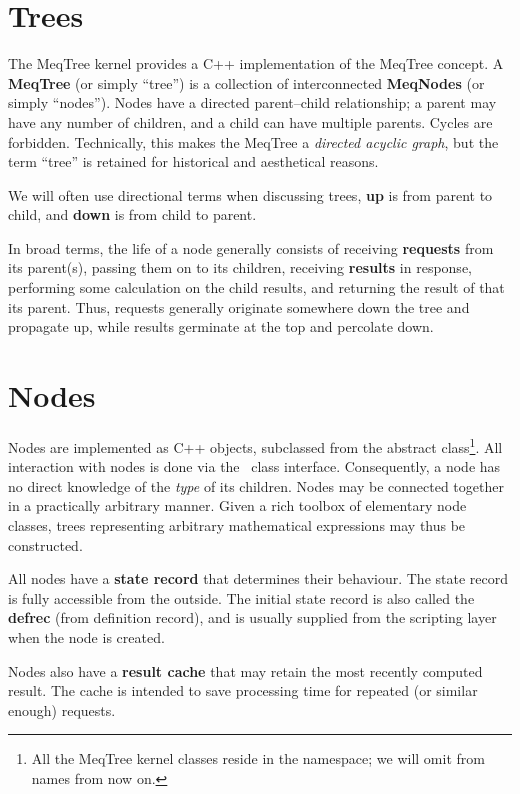 \documentclass[10pt,twoside]{book}
\begin{document}
\section{Trees}

  The MeqTree kernel provides a C++ implementation of the MeqTree concept. A {\bf
  MeqTree} (or simply ``tree'') is a collection of interconnected {\bf MeqNodes}
  (or simply ``nodes''). Nodes have a directed parent--child relationship; a
  parent may have any number of children, and a child can have multiple parents.
  Cycles are forbidden. Technically, this makes the MeqTree a {\em directed
  acyclic graph}, but the term ``tree'' is retained for historical and
  aesthetical reasons.

  We will often use directional terms when discussing trees, {\bf up} is from
  parent to child, and {\bf down} is from child to parent.

  In broad terms, the life of a node generally consists of receiving {\bf
  requests} from its parent(s), passing them on to its children, receiving {\bf
  results} in response, performing some calculation on the child results, and
  returning the result of that its parent. Thus, requests generally originate
  somewhere down the tree and propagate up, while results germinate at the top
  and percolate down. 

\section{Nodes}

  Nodes are implemented as C++ objects, subclassed from the abstract
   class\footnote{All the MeqTree kernel classes reside in the
   namespace; we will omit  from names from now on.}. All
  interaction with nodes is done via the \Node\ class interface. Consequently, a
  node has no direct knowledge of the {\em type} of its children. Nodes may be
  connected together in a practically arbitrary manner. Given a rich toolbox of
  elementary node classes, trees representing arbitrary mathematical expressions
  may thus be constructed. 

  All nodes have a {\bf state record} that determines their behaviour. The state
  record is fully accessible from the outside. The initial state record is also
  called the {\bf defrec} (from definition record), and is usually supplied from
  the scripting layer when the node is created.

  Nodes also have a {\bf result cache} that may retain the most recently computed
  result. The cache is intended to save processing time for repeated (or similar
  enough) requests.
\end{document}
